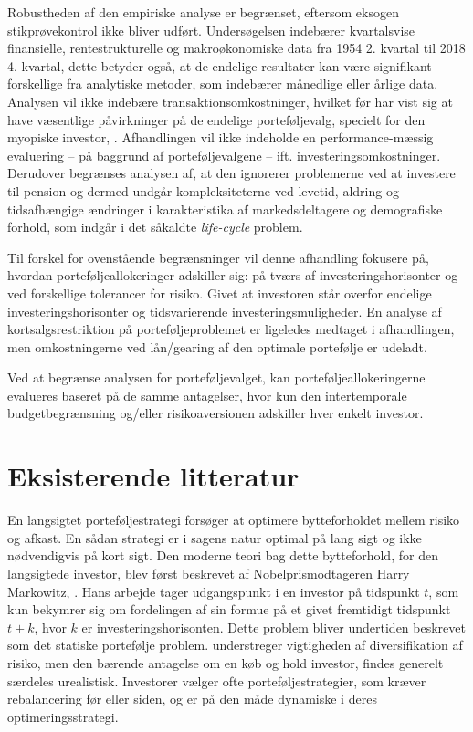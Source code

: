 \documentclass[
  a4paper,
  oneside]{memoir}
\begin{document}
Robustheden af den empiriske analyse er begrænset, eftersom eksogen stikprøvekontrol ikke bliver udført. Undersøgelsen indebærer kvartalsvise finansielle, rentestrukturelle og makroøkonomiske data fra 1954 2. kvartal til 2018 4. kvartal, dette betyder også, at de endelige resultater kan være signifikant forskellige fra analytiske metoder, som indebærer månedlige eller årlige data. Analysen vil ikke indebære transaktionsomkostninger, hvilket før har vist sig at have væsentlige påvirkninger på de endelige porteføljevalg, specielt for den myopiske investor, \citep{BalLyn1999}. Afhandlingen vil ikke indeholde en performance-mæssig evaluering -- på baggrund af porteføljevalgene -- ift. investeringsomkostninger. Derudover begrænses analysen af, at den ignorerer problemerne ved at investere til pension og dermed undgår kompleksiteterne ved levetid, aldring og tidsafhængige ændringer i karakteristika af markedsdeltagere og demografiske forhold, som indgår i det såkaldte \emph{life-cycle} problem.

Til forskel for ovenstående begrænsninger vil denne afhandling fokusere på, hvordan porteføljeallokeringer adskiller sig: på tværs af investeringshorisonter og ved forskellige tolerancer for risiko. Givet at investoren står overfor endelige investeringshorisonter og tidsvarierende investeringsmuligheder.
En analyse af kortsalgsrestriktion på porteføljeproblemet er ligeledes medtaget i afhandlingen, men omkostningerne ved lån/gearing af den optimale portefølje er udeladt.

Ved at begrænse analysen for porteføljevalget, kan porteføljeallokeringerne evalueres baseret på de samme antagelser, hvor kun den intertemporale budgetbegrænsning og/eller risikoaversionen adskiller hver enkelt investor.

\hypertarget{eksisterende-litteratur}{%
\section{Eksisterende litteratur}\label{eksisterende-litteratur}}

En langsigtet porteføljestrategi forsøger at optimere bytteforholdet mellem risiko og afkast. En sådan strategi er i sagens natur optimal på lang sigt og ikke nødvendigvis på kort sigt. Den moderne teori bag dette bytteforhold, for den langsigtede investor, blev først beskrevet af Nobelprismodtageren Harry Markowitz, \citep{Markowitz1952}. Hans arbejde tager udgangspunkt i en investor på tidspunkt \(t\), som kun bekymrer sig om fordelingen af sin formue på et givet fremtidigt tidspunkt \(t+k\), hvor \(k\) er investeringshorisonten. Dette problem bliver undertiden beskrevet som det statiske portefølje problem. \citep{Markowitz1952} understreger vigtigheden af diversifikation af risiko, men den bærende antagelse om en køb og hold investor, findes generelt særdeles urealistisk. Investorer vælger ofte porteføljestrategier, som kræver rebalancering før eller siden, og er på den måde dynamiske i deres optimeringsstrategi.
\end{document}

